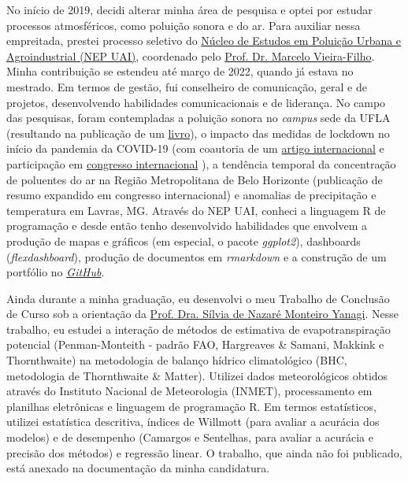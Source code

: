 \documentclass[12pt,a4paper]{article}
\begin{document}
	No início de 2019, decidi alterar minha área de pesquisa e optei por estudar processos atmosféricos, como poluição sonora e do ar. Para auxiliar nessa empreitada, prestei processo seletivo do \href{https://sites.google.com/ufla.br/nepuai?pli=1}{Núcleo de Estudos em Poluição Urbana e Agroindustrial (NEP UAI)}, coordenado pelo \href{http://lattes.cnpq.br/5059318976988668}{Prof. Dr. Marcelo Vieira-Filho}. Minha contribuição se estendeu até março de 2022, quando já estava no mestrado. Em termos de gestão, fui conselheiro de comunicação, geral e de projetos, desenvolvendo habilidades comunicacionais e de liderança. No campo das pesquisas, foram contempladas a poluição sonora no \textit{campus} sede da UFLA (resultando na publicação de um \href{https://sites.google.com/ufla.br/nepuai/publica%C3%A7%C3%B5es/livros?authuser=0}{livro}), o impacto das medidas de lockdown no início da pandemia da COVID-19 (com coautoria de um \href{https://link.springer.com/article/10.1007/s11869-020-00959-8}{artigo internacional} e participação em \href{https://www.inicepg.univap.br/cd/INIC_2021/anais/arquivos/RE_0771_0575_01.pdf}{congresso internacional} ), a tendência temporal da concentração de poluentes do ar na Região Metropolitana de Belo Horizonte (publicação de resumo expandido em congresso internacional) e anomalias de precipitação e temperatura em Lavras, MG. Através do NEP UAI, conheci a linguagem R de programação e desde então tenho desenvolvido habilidades que envolvem a produção de mapas e gráficos (em especial, o pacote \textit{ggplot2}), dashboards (\textit{flexdashboard}), produção de documentos em \textit{rmarkdown} e a construção de um portfólio no \href{https://arthurboari.github.io/arthurboari/}{\textit{GitHub}}.
	
	Ainda durante a minha graduação, eu desenvolvi o meu Trabalho de Conclusão de Curso sob a orientação da \href{http://lattes.cnpq.br/3943657653311716}{Prof. Dra. Sílvia de Nazaré Monteiro Yanagi}. Nesse trabalho, eu estudei a interação de métodos de estimativa de evapotranspiração potencial (Penman-Monteith - padrão FAO, Hargreaves \& Samani, Makkink e Thornthwaite) na metodologia de balanço hídrico climatológico (BHC, metodologia de Thornthwaite \& Matter). Utilizei dados meteorológicos obtidos através do Instituto Nacional de Meteorologia (INMET), processamento em planilhas eletrônicas e linguagem de programação R. Em termos estatísticos, utilizei estatística descritiva, índices de Willmott (para avaliar a acurácia dos modelos) e de desempenho (Camargos e Sentelhas, para avaliar a acurácia e precisão dos métodos) e regressão linear. O trabalho, que ainda não foi publicado, está anexado na documentação da minha candidatura.
	
\end{document}
